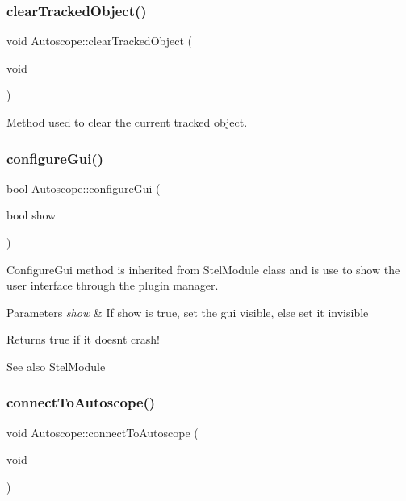 \subsubsection{\texorpdfstring{clearTrackedObject()}{clearTrackedObject()}}
{\footnotesize\ttfamily void Autoscope\+::clear\+Tracked\+Object (\begin{DoxyParamCaption}\item[{void}]{ }\end{DoxyParamCaption})}



Method used to clear the current tracked object. 

\mbox{\label{class_autoscope_a1a3fca34a12ae80391943194340d2c7e}} 
\subsubsection{\texorpdfstring{configureGui()}{configureGui()}}
{\footnotesize\ttfamily bool Autoscope\+::configure\+Gui (\begin{DoxyParamCaption}\item[{bool}]{show }\end{DoxyParamCaption})\hspace{0.3cm}{\ttfamily [virtual]}}



Configure\+Gui method is inherited from Stel\+Module class and is use to show the user interface through the plugin manager. 


\begin{DoxyParams}{Parameters}
{\em show} & If show is true, set the gui visible, else set it invisible \\
\hline
\end{DoxyParams}
\begin{DoxyReturn}{Returns}
true if it doesn\textquotesingle{}t crash! 
\end{DoxyReturn}
\begin{DoxySeeAlso}{See also}
Stel\+Module 
\end{DoxySeeAlso}
\mbox{\label{class_autoscope_a1ae78f4cada1c4e36f5a06db126017fe}} 
\subsubsection{\texorpdfstring{connectToAutoscope()}{connectToAutoscope()}}
{\footnotesize\ttfamily void Autoscope\+::connect\+To\+Autoscope (\begin{DoxyParamCaption}\item[{void}]{ }\end{DoxyParamCaption})}



